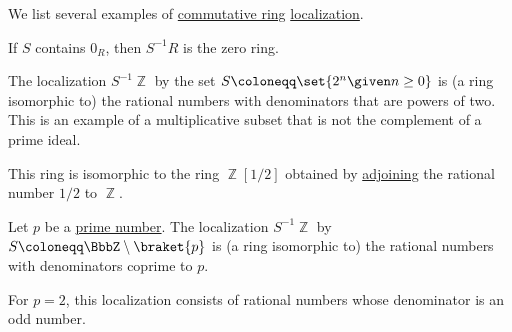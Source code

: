 \begin{example}\label{ex:def:ring_localization}
  We list several examples of \hyperref[def:ring/commutative]{commutative ring} \hyperref[def:ring_localization]{localization}.

  \begin{thmenum}
     If \( S \) contains \( 0_R \), then \( S^{-1} R \) is the zero ring.

     The localization \( S^{-1} \BbbZ \) by the set \( S \coloneqq \set{ 2^n \given n \geq 0 } \) is (a ring isomorphic to) the rational numbers with denominators that are powers of two. This is an example of a multiplicative subset that is not the complement of a prime ideal.

    This ring is isomorphic to the ring \( \BbbZ[1 / 2] \) obtained by \hyperref[def:semiring_adjunction]{adjoining} the rational number \( 1 / 2 \) to \( \BbbZ \).

     Let \( p \) be a \hyperref[def:prime_number]{prime number}. The localization \( S^{-1} \BbbZ \) by \( S \coloneqq \BbbZ \setminus \braket{ p } \) is (a ring isomorphic to) the rational numbers with denominators coprime to \( p \).

    For \( p = 2 \), this localization consists of rational numbers whose denominator is an odd number.
  \end{thmenum}
\end{example}

